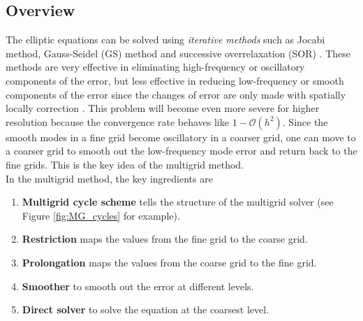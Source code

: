 \subsection{Overview} %
\label{section3.1.1}
The elliptic equations can be solved using \textit{iterative methods} such as
Jocabi method, Gauss-Seidel (GS) method and successive overrelaxation (SOR) \cite{young2014iterative}.
These methods are very effective in eliminating high-frequency or
oscillatory components of the error,
but less effective in reducing low-frequency or smooth components of the error
since the changes of error are only made with spatially locally correction \cite{briggs2000multigrid}.
This problem will become even more severe for higher resolution 
because the convergence rate behaves like $1-\mathcal{O}(h^2)$.
Since the smooth modes in a fine grid become oscillatory in a coarser grid,
one can move to a coarser grid to smooth out the low-frequency mode error and return back to the fine grids.
This is the key idea of the multigrid method.\\
In the multigrid method, the key ingredients are
\begin{enumerate}[label=(\roman*)]
    \item \textbf{Multigrid cycle scheme} tells the structure of the multigrid solver (see Figure \ref{fig:MG_cycles} for example).
    \item \textbf{Restriction} maps the values from the fine grid to the coarse grid.
    \item \textbf{Prolongation} maps the values from the coarse grid to the fine grid.
    \item \textbf{Smoother} to smooth out the error at different levels.
    \item \textbf{Direct solver} to solve the equation at the coarsest level.
\end{enumerate}
